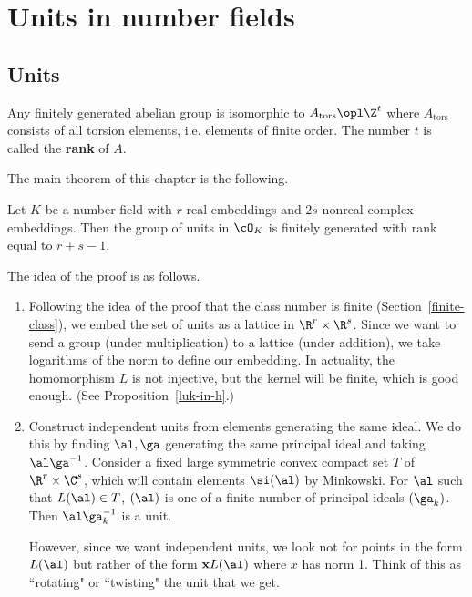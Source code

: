 \chapter{Units in number fields}
\section{Units}
Any finitely generated abelian group is isomorphic to $A_{\text{tors}}\opl \Z^t$ where $A_{\text{tors}}$ consists of all torsion elements, i.e. elements of finite order. The number $t$ is called the \textbf{rank} of $A$.

The main theorem of this chapter is the following.
\begin{thm}
Let $K$ be a number field with $r$ real embeddings and $2s$ nonreal complex embeddings. Then
the group of units in $\cO_K$ is finitely generated with rank equal to $r+s-1$.
\end{thm}
The idea of the proof is as follows.
\begin{enumerate}
\item Following the idea of the proof that the class number is finite (Section~\ref{finite-class}), we embed the set of units as a lattice in $\R^r\times \R^s$. Since we want to send a group (under multiplication) to a lattice (under addition), we take logarithms of the norm to define our embedding. In actuality, the homomorphism $L$ is not injective, but the kernel will be finite, which is good enough. (See  Proposition~\ref{luk-in-h}.)
\item Construct independent units from elements generating the same ideal. We do this by finding $\al,\ga$ generating the same principal ideal and taking $\al\ga^{-1}$.
Consider a fixed large symmetric convex compact set $T$ of $\R^{r}\times \C^s$, which will contain elements $\si(\al)$ by Minkowski. For $\al$ such that $L(\al)\in T$, $(\al)$ is one of a finite number of principal ideals $(\ga_k)$. Then $\al\ga_k^{-1}$ is a unit.

However, since we want independent units, we look not for points in the form $L(\al)$ but rather of the form $\mathbf xL(\al)$ where $x$ has norm 1. Think of this as ``rotating" or ``twisting" the unit that we get.
\end{enumerate}

